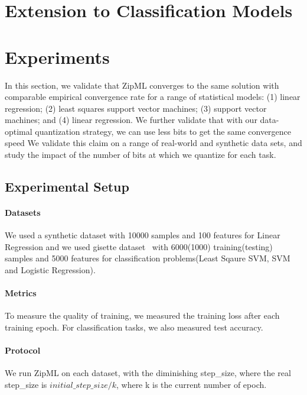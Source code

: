 \documentclass{article}
\begin{document}
\section{Extension to Classification Models}



\section{Experiments} \label{sec:exp}

In this section, we validate that ZipML 
converges to the same solution with comparable
empirical convergence rate for a range of
statistical models: (1) linear regression;
(2) least squares support vector machines;
(3) support vector machines;
and (4) linear regression. We further validate that
with our data-optimal quantization strategy, we can use
less bits to get the same convergence speed
We validate this claim on a range of real-world
and synthetic data sets, and study the impact
of the number of bits at which we quantize for each task.

\subsection{Experimental Setup}

\paragraph{Datasets} 
We used a synthetic dataset with 10000 samples and 100 features for Linear Regression and we used gisette dataset~\cite{guyon2004result} with 6000(1000) training(testing) samples and 5000 features for classification problems(Least Sqaure SVM, SVM and Logistic Regression).

\paragraph{Metrics} To measure the quality of training,
we measured the training loss after each training epoch. For classification tasks, we also measured test accuracy.

\paragraph{Protocol} We run ZipML on each dataset, with the diminishing step_size, where the real step_size is ${initial\_step\_size/k}$, where k is the current number of epoch. 
\end{document}
